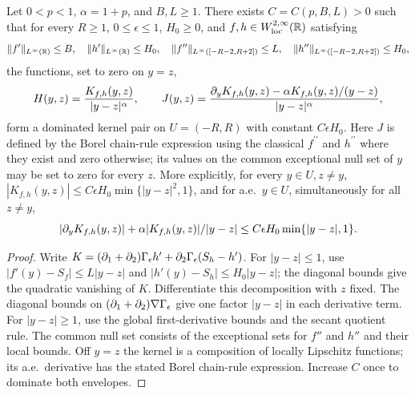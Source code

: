 \begin{lemma}
  \label{lem:c10_variation_kernel_bounds}
  Let $0<p<1$, $\alpha=1+p$, and $B,L\ge1$. There exists $C=C(p,B,L)>0$ such that for every
  $R\ge1$, $0\le\epsilon\le1$, $H_0\ge0$, and $f,h\in W^{2,\infty}_{\mathrm{loc}}(\mathbb{R})$ satisfying
  \[
    \|f'\|_{L^\infty(\mathbb{R})}\le B,\quad \|h'\|_{L^\infty(\mathbb{R})}\le H_0,\quad
    \|f''\|_{L^\infty([-R-2,R+2])}\le L,\quad
    \|h''\|_{L^\infty([-R-2,R+2])}\le H_0,
  \]
  the functions, set to zero on $y=z$,
  \[
    H(y,z)=\frac{K_{f,h}(y,z)}{|y-z|^\alpha},\qquad
    J(y,z)=\frac{\partial_yK_{f,h}(y,z)-\alpha K_{f,h}(y,z)/(y-z)}{|y-z|^\alpha},
  \]
  form a dominated kernel pair on $U=(-R,R)$ with constant $C\epsilon H_0$.
  Here $J$ is defined by the Borel chain-rule expression using the classical $f^{\prime\prime}$
  and $h^{\prime\prime}$ where they exist and zero otherwise; its values on the common exceptional
  null set of $y$ may be set to zero for every $z$. More explicitly, for every $y\in U,z\ne y$,
  $|K_{f,h}(y,z)|\le C\epsilon H_0\min\{|y-z|^2,1\}$, and for a.e.\ $y\in U$, simultaneously for all
  $z\ne y$,
  \[
    |\partial_yK_{f,h}(y,z)|+\alpha|K_{f,h}(y,z)|/|y-z|
       \le C\epsilon H_0\min\{|y-z|,1\}.
  \]
\end{lemma}
\begin{proof}
  Write $K=(\partial_1+\partial_2)\Gamma_\epsilon h'+\partial_2\Gamma_\epsilon(S_h-h')$.
  For $|y-z|\le1$, use $|f'(y)-S_f|\le L|y-z|$ and
  $|h'(y)-S_h|\le H_0|y-z|$; the diagonal bounds give the quadratic vanishing of $K$.
  Differentiate this decomposition with $z$ fixed. The diagonal bounds on
  $(\partial_1+\partial_2)\nabla\Gamma_\epsilon$ give one factor $|y-z|$ in each derivative term.
  For $|y-z|\ge1$, use the global first-derivative bounds and the secant quotient rule.
  The common null set consists of the exceptional sets for $f''$ and $h''$ and their local bounds.
  Off $y=z$ the kernel is a composition of locally Lipschitz functions; its a.e.\ derivative has
  the stated Borel chain-rule expression. Increase $C$ once to dominate both envelopes.
\end{proof}

